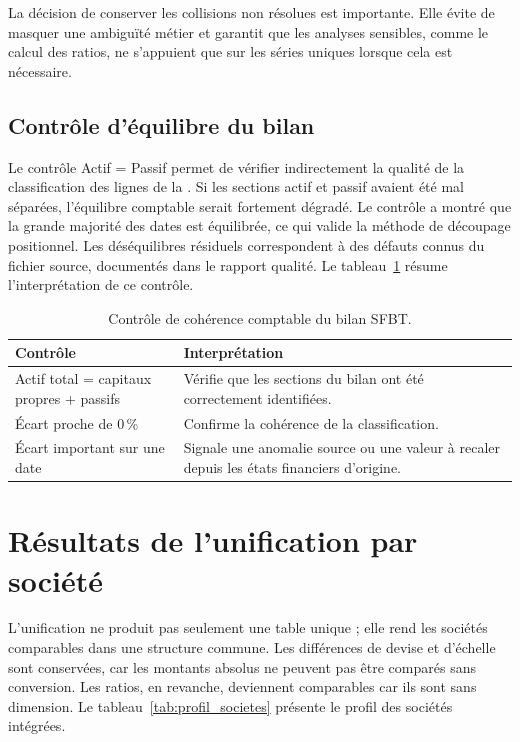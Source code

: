 \par La décision de conserver les collisions non résolues est importante. Elle
évite de masquer une ambiguïté métier et garantit que les analyses sensibles,
comme le calcul des ratios, ne s'appuient que sur les séries uniques lorsque cela
est nécessaire.

\subsection{Contrôle d'équilibre du bilan}
\par Le contrôle Actif = Passif permet de vérifier indirectement la qualité de la
classification des lignes de la \sfbt. Si les sections actif et passif avaient
été mal séparées, l'équilibre comptable serait fortement dégradé. Le contrôle a
montré que la grande majorité des dates est équilibrée, ce qui valide la méthode
de découpage positionnel. Les déséquilibres résiduels correspondent à des défauts
connus du fichier source, documentés dans le rapport qualité. Le
tableau~\ref{tab:controle_bilan} résume l'interprétation de ce contrôle.

\begin{table}[H]
\centering
\caption[Contrôle de cohérence comptable]{Contrôle de cohérence comptable du bilan SFBT.}
\label{tab:controle_bilan}
\begin{tabularx}{\linewidth}{|p{4cm}|X|}
\hline
\textbf{Contrôle} & \textbf{Interprétation} \\ \hline
Actif total = capitaux propres + passifs & Vérifie que les sections du bilan ont été correctement identifiées. \\ \hline
Écart proche de 0\,\% & Confirme la cohérence de la classification. \\ \hline
Écart important sur une date & Signale une anomalie source ou une valeur à recaler depuis les états financiers d'origine. \\ \hline
\end{tabularx}
\end{table}


\section{Résultats de l'unification par société}
\label{sec:resultats_societes}
\par L'unification ne produit pas seulement une table unique ; elle rend les
sociétés comparables dans une structure commune. Les différences de devise et
d'échelle sont conservées, car les montants absolus ne peuvent pas être comparés
sans conversion. Les ratios, en revanche, deviennent comparables car ils sont
sans dimension. Le tableau~\ref{tab:profil_societes} présente le profil des
sociétés intégrées.


